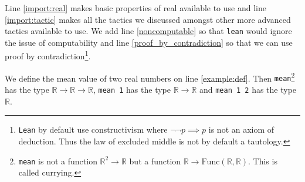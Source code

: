 \documentclass{report}
\theoremstyle{definition}
\begin{document}
Line \ref{import:real} makes basic properties of real available to use and line \ref{import:tactic} makes all the tactics we discussed amongst other more advanced tactics available to use. We add line \ref{noncomputable} so that {\tt \small lean} would ignore the issue of computability and line \ref{proof_by_contradiction} so that we can use proof by contradiction\footnote{{\tt \small Lean} by default use constructivism where $\neg\neg p\implies p$ is not an axiom of deduction. Thus the law of excluded middle is not by default a tautology.}. 

We define the mean value of two real numbers on line \ref{example:def}. Then {\tt \small mean}\footnote{{\tt \small mean} is not a function $\mathbb R^2\to\mathbb R$ but a function $\mathbb R\to\mathrm{Func}(\mathbb R,\mathbb R)$. This is called currying.} has the type $\mathbb R\to \mathbb R\to \mathbb R$, {\tt \small mean 1} has the type $\mathbb R\to \mathbb R$ and {\tt \small mean 1 2} has the type $\mathbb R$. 
\end{document}

